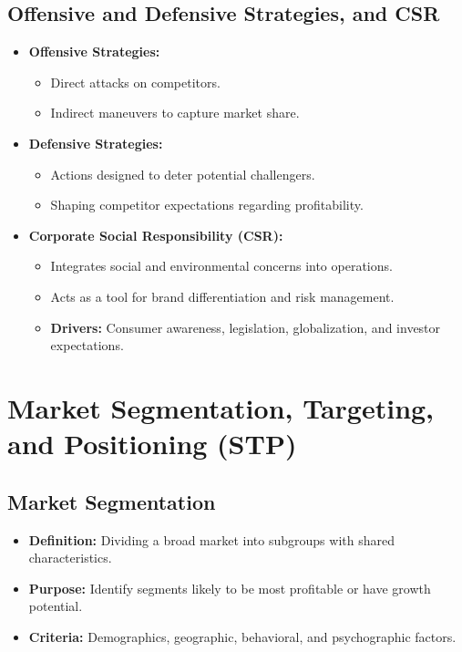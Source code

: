 \documentclass[12pt,a4paper]{report}
\begin{document}
\section{Offensive and Defensive Strategies, and CSR}
\begin{itemize}
    \item \textbf{Offensive Strategies:}
         \begin{itemize}
             \item Direct attacks on competitors.
             \item Indirect maneuvers to capture market share.
         \end{itemize}
    \item \textbf{Defensive Strategies:}
         \begin{itemize}
             \item Actions designed to deter potential challengers.
             \item Shaping competitor expectations regarding profitability.
         \end{itemize}
    \item \textbf{Corporate Social Responsibility (CSR):}
         \begin{itemize}
             \item Integrates social and environmental concerns into operations.
             \item Acts as a tool for brand differentiation and risk management.
             \item \textbf{Drivers:} Consumer awareness, legislation, globalization, and investor expectations.
         \end{itemize}
\end{itemize}

\chapter{Market Segmentation, Targeting, and Positioning (STP)}

\section{Market Segmentation}
\begin{itemize}
    \item \textbf{Definition:} Dividing a broad market into subgroups with shared characteristics.
    \item \textbf{Purpose:} Identify segments likely to be most profitable or have growth potential.
    \item \textbf{Criteria:} Demographics, geographic, behavioral, and psychographic factors.
\end{itemize}
\end{document}
